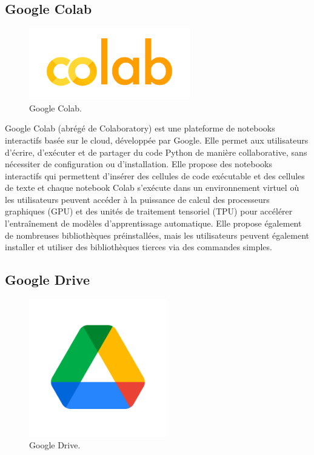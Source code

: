 \subsection{Google Colab}

\begin{figure}[hbt!]
  \centering
  \includegraphics[width=7cm]{images_pfe/colab.png}
  \caption{Google Colab.}
  \label{fig:colab}
\end{figure}
\FloatBarrier
\medskip

Google Colab (abrégé de Colaboratory) est une plateforme de notebooks interactifs basée sur le cloud, développée par Google. Elle permet aux utilisateurs d'écrire, d'exécuter et de partager du code Python de manière collaborative, sans nécessiter de configuration ou d'installation. Elle propose des notebooks interactifs qui permettent d'insérer des cellules de code exécutable et des cellules de texte et chaque notebook Colab s'exécute dans un environnement virtuel où les utilisateurs peuvent accéder à la puissance de calcul des processeurs graphiques (GPU) et des unités de traitement tensoriel (TPU) pour accélérer l'entraînement de modèles d'apprentissage automatique. Elle propose également de nombreuses bibliothèques préinstallées, mais les utilisateurs peuvent également installer et utiliser des bibliothèques tierces via des commandes simples.

\subsection{Google Drive}

\begin{figure}[hbt!]
  \centering
  \includegraphics[width=6cm]{images_pfe/drive.png}
  \caption{Google Drive.}
  \label{fig:drive}
\end{figure}
\FloatBarrier
\medskip

